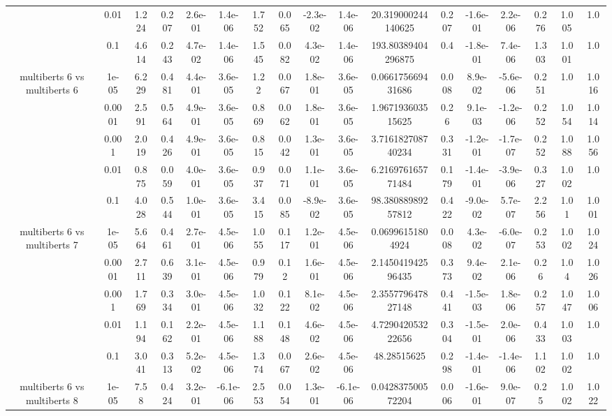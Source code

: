 \begin{tabular}{|c|c|c|c|c|c|c|c|c|c|c|c|c|c|c|c|c|}
 & 0.01 & 1.224 & 0.207 & 2.6e-01 & 1.4e-06 & 1.752 & 0.065 & -2.3e-02 & 1.4e-06 & 20.319000244140625 & 0.207 & -1.6e-01 & 2.2e-06 & 0.276 & 1.005 & 1.0 \\
 & 0.1 & 4.614 & 0.243 & 4.7e-02 & 1.4e-06 & 1.545 & 0.082 & 4.3e-02 & 1.4e-06 & 193.80389404296875 & 0.4 & -1.8e-01 & 7.4e-06 & 1.303 & 1.001 & 1.0 \\
\hline
\multirow{5}{*}{multiberts 6 vs multiberts 6} & 1e-05 & 6.229 & 0.481 & 4.4e-01 & 3.6e-05 & 1.22 & 0.067 & 1.8e-01 & 3.6e-05 & 0.066175669431686 & 0.008 & 8.9e-02 & -5.6e-06 & 0.251 & 1.0 & 1.016 \\
 & 0.0001 & 2.591 & 0.564 & 4.9e-01 & 3.6e-05 & 0.869 & 0.062 & 1.8e-01 & 3.6e-05 & 1.967193603515625 & 0.26 & 9.1e-03 & -1.2e-06 & 0.252 & 1.054 & 1.014 \\
 & 0.001 & 2.019 & 0.426 & 4.9e-01 & 3.6e-05 & 0.815 & 0.042 & 1.3e-01 & 3.6e-05 & 3.716182708740234 & 0.331 & -1.2e-01 & -1.7e-07 & 0.252 & 1.088 & 1.056 \\
 & 0.01 & 0.875 & 0.059 & 4.0e-01 & 3.6e-05 & 0.937 & 0.071 & 1.1e-01 & 3.6e-05 & 6.216976165771484 & 0.179 & -1.4e-01 & -3.9e-06 & 0.327 & 1.002 & 1.0 \\
 & 0.1 & 4.028 & 0.544 & 1.0e-01 & 3.6e-05 & 3.415 & 0.085 & -8.9e-02 & 3.6e-05 & 98.38088989257812 & 0.422 & -9.0e-02 & 5.7e-07 & 2.256 & 1.01 & 1.001 \\
\hline
\multirow{5}{*}{multiberts 6 vs multiberts 7} & 1e-05 & 5.664 & 0.461 & 2.7e-01 & 4.5e-06 & 1.055 & 0.117 & 1.2e-01 & 4.5e-06 & 0.06996151804924 & 0.008 & 4.3e-02 & -6.0e-07 & 0.253 & 1.002 & 1.024 \\
 & 0.0001 & 2.711 & 0.639 & 3.1e-01 & 4.5e-06 & 0.979 & 0.12 & 1.6e-01 & 4.5e-06 & 2.145041942596435 & 0.373 & 9.4e-02 & 2.1e-06 & 0.26 & 1.04 & 1.026 \\
 & 0.001 & 1.769 & 0.334 & 3.0e-01 & 4.5e-06 & 1.032 & 0.122 & 8.1e-02 & 4.5e-06 & 2.355779647827148 & 0.441 & -1.5e-03 & 1.8e-06 & 0.257 & 1.047 & 1.006 \\
 & 0.01 & 1.194 & 0.162 & 2.2e-01 & 4.5e-06 & 1.188 & 0.148 & 4.6e-02 & 4.5e-06 & 4.729042053222656 & 0.304 & -1.5e-01 & 2.0e-06 & 0.433 & 1.003 & 1.0 \\
 & 0.1 & 3.041 & 0.313 & 5.2e-02 & 4.5e-06 & 1.374 & 0.067 & 2.6e-02 & 4.5e-06 & 48.28515625 & 0.298 & -1.4e-01 & -1.4e-06 & 1.102 & 1.002 & 1.0 \\
\hline
\multirow{5}{*}{multiberts 6 vs multiberts 8} & 1e-05 & 7.58 & 0.424 & 3.2e-01 & -6.1e-06 & 2.553 & 0.054 & 1.3e-01 & -6.1e-06 & 0.042837500572204 & 0.006 & -1.6e-01 & 9.0e-07 & 0.25 & 1.002 & 1.022 \\

\end{tabular}
